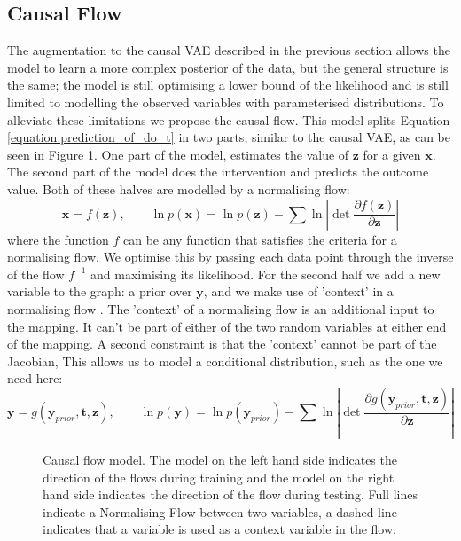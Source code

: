 \documentclass{report}
\newcommand{\bt}{\mathbf{t}}
\newcommand{\bx}{\mathbf{x}}
\newcommand{\by}{\mathbf{y}}
\newcommand{\bz}{\mathbf{z}}
\newcommand{\parfrac}[2]{\frac{\partial #1}{\partial#2}}
\begin{document}
\subsection{Causal Flow}
The augmentation to the causal VAE described in the previous section allows the model to learn a more complex posterior of the data, but the general structure is the same; the model is still optimising a lower bound of the likelihood and is still limited to modelling the observed variables with parameterised distributions. To alleviate these limitations we propose the causal flow. This model splits Equation \ref{equation:prediction_of_do_t} in two parts, similar to the causal VAE, as can be seen in Figure \ref{fig:causal_flow_with_y_prior}. One part of the model, estimates the value of $\bz$ for a given $\bx$. The second part of the model does the intervention and predicts the outcome value. Both of these halves are modelled by a normalising flow:
\begin{equation}
    \bx = f(\bz), \qquad \ln p(\bx) = \ln p(\bz) - \sum \ln \left|\det \parfrac{f(\bz)}{\bz}\right| 
\end{equation}
where the function $f$ can be any function that satisfies the criteria for a normalising flow. We optimise this by passing each data point through the inverse of the flow $f^{-1}$ and maximising its likelihood. For the second half we add a new variable to the graph: a prior over $\by$, and we make use of 'context' in a normalising flow \cite{papamakarios2019normalizing} \cite{dinh2016density}. The 'context' of a normalising flow is an additional input to the mapping. It can't be part of either of the two random variables at either end of the mapping. A second constraint is that the 'context' cannot be part of the Jacobian, %
This allows us to model a conditional distribution, such as the one we need here:
\begin{equation}
    \by = g(\by_{prior}, \bt, \bz), \qquad \ln p(\by) = \ln p(\by_{prior}) - \sum \ln \left|\det \parfrac{g(\by_{prior}, \bt, \bz)}{\bz}\right| 
\end{equation}

\begin{figure}
    \centering
    
    \qquad
    
    \caption{Causal flow model. The model on the left hand side indicates the direction of the flows during training and the model on the right hand side indicates the direction of the flow during testing. Full lines indicate a Normalising Flow between two variables, a dashed line indicates that a variable is used as a context variable in the flow.}
    \label{fig:causal_flow_with_y_prior}
\end{figure}
\end{document}
